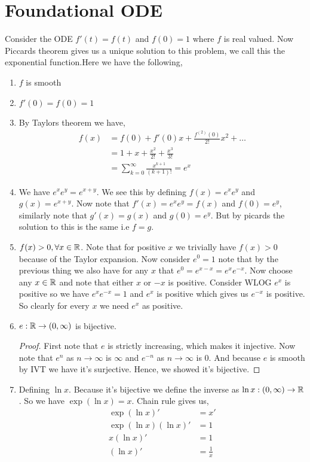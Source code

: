 \section{Foundational ODE}
Consider the ODE $f'(t) = f(t)$ and $f(0) = 1$ where $f$ is real valued. Now Piccards theorem gives us a unique solution to this problem, we call this the exponential function.Here we have the following, 
\begin{enumerate}
  \item $f$ is smooth
  \item $f'(0) = f(0) = 1$
  \item  By Taylors theorem we have, 
    \begin{align*}
      f(x) &= f(0) + f'(0)x + \frac{f^{(2)}(0)}{2!}x^2 + \dots\\
           &= 1 + x + \frac{x^2}{2!} + \frac{x^{3}}{3!}\\
           &= \sum_{k = 0}^{\infty} \frac{x^{k + 1}}{(k + 1)!} = e^{x}
    \end{align*}
  \item We have $e^{x}e^{y} = e^{x + y}$. We see this by defining $f(x) = e^{x}e^{y}$ and $g(x) = e^{x + y}$. Now note that $f'(x) = e^{x}e^{y} = f(x)$ and $f(0) = e^{y}$, similarly note that $g'(x) = g(x)$ and $g(0) = e^{y}$. But by picards the solution to this is the same i.e $f = g$.
  \item $f(x) > 0, \forall x \in \mathbb{R}$. Note that for positive $x$ we trivially have $f(x) > 0$ because of the Taylor expansion. Now consider $e^{0} = 1$ note that by the previous thing we also have for any $x$ that $e^{0} = e^{x - x} = e^{x} e^{-x}$. Now choose any $x \in \mathbb{R}$ and note that either $x$ or $-x$ is positive. Consider WLOG $e^{x}$ is positive so we have $e^{x} e^{-x} = 1$ and $e^{x}$ is positive which gives us $e^{-x}$ is positive. So clearly for every $x$ we need $e^{x}$ as positive.
  \item $e:\mathbb{R} \to (0, \infty)$ is bijective. 
    \begin{proof}
      First note that $e$ is strictly increasing, which makes it injective. Now note that $e^{n}$ as $n \to \infty$ is $\infty$ and $e^{-n}$ as $n \to \infty$ is 0. And because $e$ is smooth by IVT we have it's surjective. Hence, we showed it's bijective.
    \end{proof}

  \item Defining $\ln x$. Because it's bijective we define the inverse as $\ln x: (0, \infty) \to \mathbb{R}$. So we have $\exp(\ln x) = x$. Chain rule gives us, 
    \begin{align*}
      \exp(\ln x)' &= x'\\
      \exp(\ln x) (\ln x)' &= 1\\
      x(\ln x)' &= 1\\
      (\ln x)' &= \frac{1}{x}\\
    \end{align*}
\end{enumerate}



